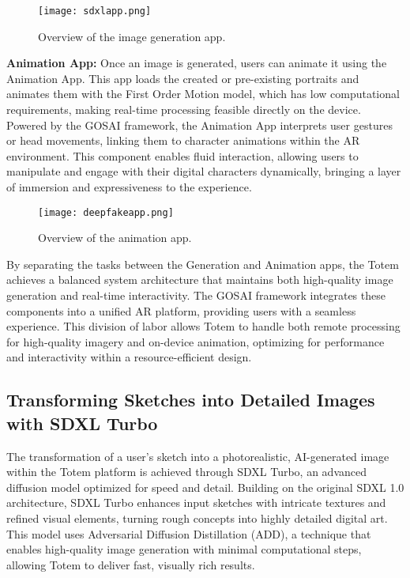 \begin{figure}[h]
    \centering
    \texttt{[image: sdxlapp.png]}
    \caption{Overview of the image generation app.}
    \vspace{0.1cm}
    \label{fig:imgenapp}
\end{figure}

\textbf{Animation App:} Once an image is generated, users can animate it using the Animation App.
This app loads the created or pre-existing portraits and animates them with the First Order Motion model, which has low computational requirements, making real-time processing feasible directly on the device.
Powered by the GOSAI framework, the Animation App interprets user gestures or head movements, linking them to character animations within the AR environment.
This component enables fluid interaction, allowing users to manipulate and engage with their digital characters dynamically, bringing a layer of immersion and expressiveness to the experience.

\begin{figure}[h]
    \centering
    \texttt{[image: deepfakeapp.png]}
    \caption{Overview of the animation app.}
    \vspace{0.1cm}
    \label{fig:deepfakeapp}
\end{figure}

By separating the tasks between the Generation and Animation apps, the Totem achieves a balanced system architecture that maintains both high-quality image generation and real-time interactivity.
The GOSAI framework integrates these components into a unified AR platform, providing users with a seamless experience.
This division of labor allows Totem to handle both remote processing for high-quality imagery and on-device animation, optimizing for performance and interactivity within a resource-efficient design.

\subsection{Transforming Sketches into Detailed Images with SDXL Turbo}

The transformation of a user’s sketch into a photorealistic, AI-generated image within the Totem platform is achieved through SDXL Turbo, an advanced diffusion model optimized for speed and detail.
Building on the original SDXL 1.0 architecture, SDXL Turbo enhances input sketches with intricate textures and refined visual elements, turning rough concepts into highly detailed digital art.
This model uses Adversarial Diffusion Distillation (ADD), a technique that enables high-quality image generation with minimal computational steps, allowing Totem to deliver fast, visually rich results.

